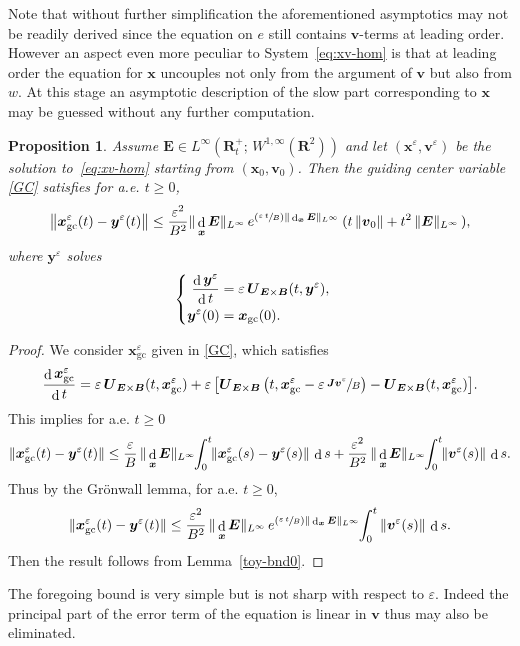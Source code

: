 \documentclass[JEP,XML,SOM,Unicode]{cedram}
\newenvironment{splitcases}
{\begin{cases}\begin{aligned}}
{\end{aligned}\end{cases}}
\newcommand{\Psfrac}[2]{(\sfrac{#1}{#2})}
\let\eps\varepsilon
\DeclareMathOperator\dD{d}\let\dd\dD
\theoremstyle{plain}
\newtheorem{proposition}[theorem]{Proposition}
\theoremstyle{definition}
\newcommand{\be}{\begin{equation}}
\newcommand{\ee}{\end{equation}}
\newcommand{\bpr}{\begin{proposition}}
\newcommand{\epr}{\end{proposition}}
\newcommand\R{\mathbf R}
\newcommand\bB{{\boldsymbol B}}
\newcommand\bE{{\boldsymbol E}}
\newcommand\bJ{{\boldsymbol J}}
\newcommand\bU{{\boldsymbol U}}
\newcommand\bfv{{\boldsymbol v}}
\newcommand\bfx{{\boldsymbol x}}
\newcommand\bfy{{\boldsymbol y}}
\let\e w
\newcommand{\GC}{\bfx_\mathrm{gc}}
\newcommand{\EcB}{\bU_{\bE\times\bB}}
\begin{document}
Note that without further simplification the aforementioned asymptotics may not be readily derived since the equation on $e$ still contains $\bfv$-terms at leading order. However an aspect even more peculiar to System~\eqref{eq:xv-hom} is that at leading order the equation for $\bfx$ uncouples not only from the argument of $\bfv$ but also from $\e$. At this stage an asymptotic description of the slow part corresponding to $\bfx$ may be guessed without any further computation.

\bpr
\label{toy-cheap}
Assume $\bE\in L^\infty\left(\R^+_t;\,W^{1,\infty}(\R^2)\right)$ and let
$(\bfx^\eps,\bfv^\eps)$ be the solution to~\eqref{eq:xv-hom} starting from
$(\bfx_0,\bfv_0)$. Then the guiding center variable \eqref{GC} satisfies
for a.e. $t\geq 0$,
\[
\left\|\GC^\eps(t)-\bfy^\eps(t)\right\|
\leq
\frac{\eps^2}{B^2}\|\dD_\bfx\bE\|_{L^\infty}\,e^{\Psfrac{\eps\,t}{B}\|\dD_\bfx\bE\|_{L^\infty}}\,
(t\,\|\bfv_0\|+t^2\,\|\bE\|_{L^\infty}\,),
\]
where $\bfy^\eps$ solves
\be
\label{GC2D}
\begin{splitcases}
\frac{\dD\bfy^\eps}{\dD t}&=\eps\,\EcB(t,\bfy^\eps),
\\
\bfy^\eps(0)&=\GC(0).
\end{splitcases}
\ee
\epr

\begin{proof}
We consider $\GC^\eps$ given in \eqref{GC}, which satisfies
\[
\frac{\dD\GC^\eps}{\dD t}=\eps\,\EcB(t,\GC^\eps)
+\eps\,\bigl[\EcB\left(t,\GC^\eps-\eps\,\sfrac{\bJ\bfv^\eps}{B}\right)-\EcB(t,\GC^\eps)\bigr].
\]
This implies for a.e. $t\geq0$
\[
\|\GC^\eps(t)-\bfy^\eps(t)\|
\leq \frac{\eps}{B}\,\|\dD_\bfx\bE\|_{L^\infty}\hspace*{-1mm}\int_0^t\hspace*{-1mm}\|\GC^\eps(s)-\bfy^\eps(s)\|\,\dD s
+\frac{\eps^2}{B^2}\,\|\dD_\bfx\bE\|_{L^\infty}\hspace*{-1mm}\int_0^t\hspace*{-1mm}\|\bfv^\eps(s)\|\,\dD s.
\]
Thus by the Grönwall lemma, for a.e. $t\geq0$,
\[
\|\GC^\eps(t)-\bfy^\eps(t)\|
\leq \frac{\eps^2}{B^2}\,\|\dD_\bfx\bE\|_{L^\infty}\,e^{\Psfrac{\eps\,t}{B}\|\dD_\bfx\bE\|_{L^\infty}}\hspace*{-1mm}\int_0^t\|\bfv^\eps(s)\|\,\dD s.
\]
Then the result follows from Lemma~\ref{toy-bnd0}.
\end{proof}

The foregoing bound is very simple but is not sharp with respect to $\eps$. Indeed the principal part of the error term of the equation is linear in $\bfv$ thus may also be eliminated.
\end{document}
